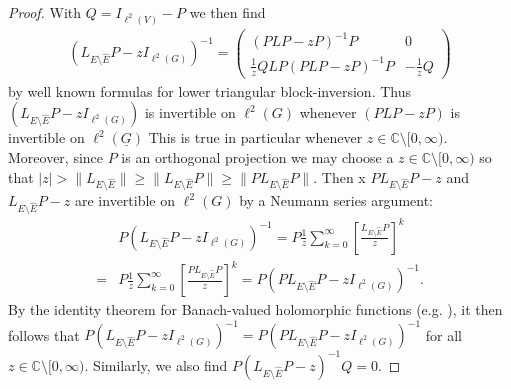 \documentclass[reqno,12pt,letterpaper]{amsart}
\numberwithin{equation}{section}
\newcommand{\1}{\mathds{1}}
\theoremstyle{definition}
\begin{document}
\begin{proof}
With $ Q = I_{\ell^2(V)} - P$	we then find 
	\begin{align}\label{schur_inverse_resolvent}
			(L_{E \setminus \hat{E}} P -z I_{\ell^2(G)})^{-1}
				=
				\begin{pmatrix}
					 (PLP - zP)^{-1} P & 0 \\
					\frac{1}{z} Q L P  (PLP - zP)^{-1} P & -\frac{1}{z} Q
				\end{pmatrix}
	\end{align}
	by well known formulas for lower triangular block-inversion. Thus $	(L_{E \setminus \hat{E}} P -z I_{\ell^2(G)})$ is invertible on  $\ell^2(G)$ whenever $(PLP - zP)$ is invertible on  $\ell^2(\underline{G})$ This is true   in particular whenever $z \in \mathds{C}\setminus[0,\infty)$. Moreover, since $P$ is an orthogonal projection we may choose a $z \in \mathds{C}\setminus [0,\infty)$ so that  $|z| > \|L_{E \setminus \hat{E}}\| \geq  \|L_{E \setminus \hat{E}}P\| \geq \|PL_{E \setminus \hat{E}}P\|$. Then x $PL_{E \setminus \hat{E}} P - z$ and $L_{E \setminus \hat{E}} P - z$  are invertible on $\ell^2(G)$ by a Neumann series argument:
\begin{align}
	&P(L_{E \setminus \hat{E}} P -z I_{\ell^2(G)})^{-1} = P \frac{1}{z} \sum\limits_{k = 0}^{\infty} \left[ \frac{L_{E \setminus \hat{E}} P}{z}\right]^k \\
	= &P \frac{1}{z} \sum\limits_{k = 0}^{\infty} \left[ \frac{P L_{E \setminus \hat{E}} P}{z}\right]^k = P(P L_{E \setminus \hat{E}} P -z I_{\ell^2(G)})^{-1}.
\end{align}
By the identity theorem for Banach-valued holomorphic functions (e.g.  \cite[Proposition A.2]{Arendt2001}), it then follows that $P(L_{E \setminus \hat{E}} P -z I_{\ell^2(G)})^{-1} = P(P L_{E \setminus \hat{E}} P -z I_{\ell^2(G)})^{-1}$ for all $z \in \mathds{C}\setminus[0,\infty)$. Similarly, we also find $P(L_{E \setminus \hat{E}} P -z)^{-1} Q = 0$.

\medskip


\end{proof}
\end{document}

